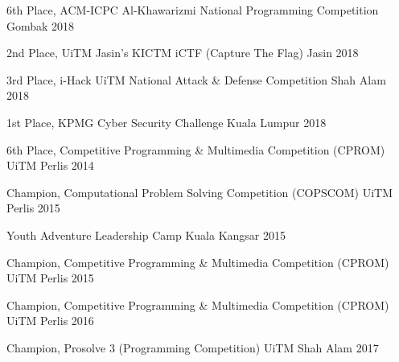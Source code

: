 \begin{cvhonors}
  \cvhonor
    {6th Place,}
    {ACM-ICPC Al-Khawarizmi National Programming Competition}
    {Gombak}
    {2018}

  \cvhonor
    {2nd Place,}
    {UiTM Jasin's KICTM iCTF (Capture The Flag) }
    {Jasin}
    {2018}

  \cvhonor
    {3rd Place,}
    {i-Hack UiTM National Attack \& Defense Competition}
    {Shah Alam}
    {2018}

  \cvhonor
    {1st Place,}
    {KPMG Cyber Security Challenge}
    {Kuala Lumpur}
    {2018}

\end{cvhonors}


\begin{cvhonors}

  \cvhonor
    {6th Place,}
    {Competitive Programming \& Multimedia Competition (CPROM)}
    {UiTM Perlis}
    {2014}

  \cvhonor
    {Champion,}
    {Computational Problem Solving Competition (COPSCOM)}
    {UiTM Perlis}
    {2015}

  \cvhonor
    {}
    {Youth Adventure Leadership Camp}
    {Kuala Kangsar}
    {2015}

  \cvhonor
    {Champion,}
    {Competitive Programming \& Multimedia Competition (CPROM)}
    {UiTM Perlis}
    {2015}
        
  \cvhonor
    {Champion,}
    {Competitive Programming \& Multimedia Competition (CPROM)}
    {UiTM Perlis}
    {2016}

  \cvhonor
    {Champion,}
    {Prosolve 3 (Programming Competition)}
    {UiTM Shah Alam}
    {2017}

\end{cvhonors}
